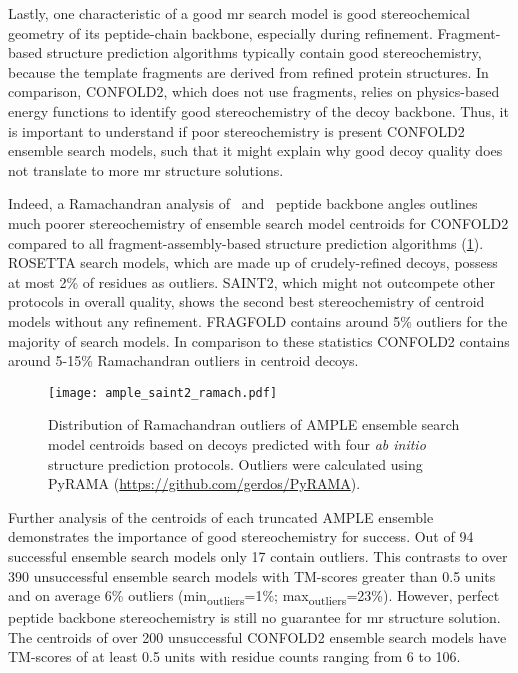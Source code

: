 Lastly, one characteristic of a good \gls{mr} search model is good stereochemical geometry of its peptide-chain backbone, especially during refinement. Fragment-based structure prediction algorithms typically contain good stereochemistry, because the template fragments are derived from refined protein structures. In comparison, CONFOLD2, which does not use fragments, relies on physics-based energy functions to identify good stereochemistry of the decoy backbone. Thus, it is important to understand if poor stereochemistry is present CONFOLD2 ensemble search models, such that it might explain why good decoy quality does not translate to more \gls{mr} structure solutions.

Indeed, a Ramachandran analysis of \textphi\ and \textpsi\ peptide backbone angles outlines much poorer stereochemistry of ensemble search model centroids for CONFOLD2 compared to all fragment-assembly-based structure prediction algorithms (\cref{fig:ample_saint2_ramach}). ROSETTA search models, which are made up of crudely-refined decoys, possess at most 2\% of residues as outliers. SAINT2, which might not outcompete other protocols in overall quality, shows the second best stereochemistry of centroid models without any refinement.  FRAGFOLD contains around 5\% outliers for the majority of search models. In comparison to these statistics CONFOLD2 contains around 5-15\% Ramachandran outliers in centroid decoys. 

\begin{figure}[H]
    \centering
    \texttt{[image: ample\_saint2\_ramach.pdf]}
    \caption[Ramachandran outliers of ensemble search model centroids]{Distribution of Ramachandran outliers of AMPLE ensemble search model centroids based on decoys predicted with four \textit{ab initio} structure prediction protocols. Outliers were calculated using PyRAMA (\href{https://github.com/gerdos/PyRAMA}{https://github.com/gerdos/PyRAMA}).}
    \label{fig:ample_saint2_ramach}
\end{figure}

Further analysis of the centroids of each truncated AMPLE ensemble demonstrates the importance of good stereochemistry for success. Out of 94 successful ensemble search models only 17 contain outliers. This contrasts to over 390 unsuccessful ensemble search models with TM-scores greater than 0.5 units and on average 6\% outliers (min\textsubscript{outliers}=1\%; max\textsubscript{outliers}=23\%). However, perfect peptide backbone stereochemistry is still no guarantee for \gls{mr} structure solution. The centroids of over 200 unsuccessful CONFOLD2 ensemble search models have TM-scores of at least 0.5 units with residue counts ranging from 6 to 106.

